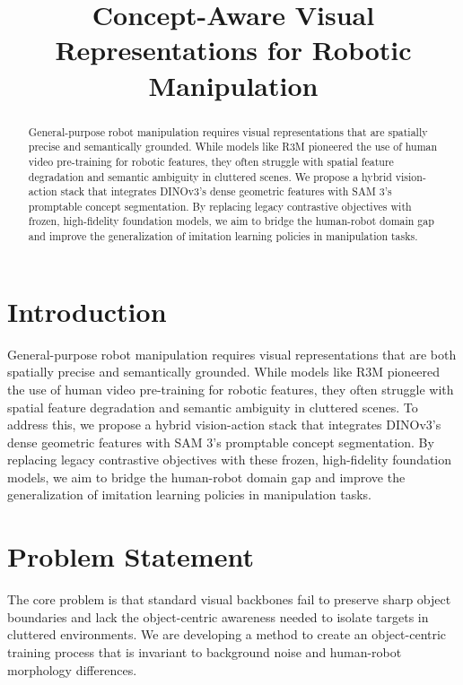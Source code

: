 \documentclass[conference]{IEEEtran}
\begin{document}
\title{Concept-Aware Visual Representations for Robotic Manipulation}

\author{
\and
{}
}

\maketitle

\begin{abstract}
General-purpose robot manipulation requires visual representations that are spatially precise and semantically grounded.
While models like R3M pioneered the use of human video pre-training for robotic features, they often struggle with spatial feature degradation and semantic ambiguity in cluttered scenes.
We propose a hybrid vision-action stack that integrates DINOv3's dense geometric features with SAM 3's promptable concept segmentation.
By replacing legacy contrastive objectives with frozen, high-fidelity foundation models, we aim to bridge the human-robot domain gap and improve the generalization of imitation learning policies in manipulation tasks.
\end{abstract}

\IEEEpeerreviewmaketitle

\section{Introduction}
General-purpose robot manipulation requires visual representations that are both spatially precise and semantically grounded. While models like R3M pioneered the use of human video pre-training for robotic features, they often struggle with spatial feature degradation and semantic ambiguity in cluttered scenes. To address this, we propose a hybrid vision-action stack that integrates DINOv3's dense geometric features with SAM 3's promptable concept segmentation. By replacing legacy contrastive objectives with these frozen, high-fidelity foundation models, we aim to bridge the human-robot domain gap and improve the generalization of imitation learning policies in manipulation tasks. 

\section{Problem Statement}
The core problem is that standard visual backbones fail to preserve sharp object boundaries and lack the object-centric awareness needed to isolate targets in cluttered environments. We are developing a method to create an object-centric training process that is invariant to background noise and human-robot morphology differences. 
\end{document}
